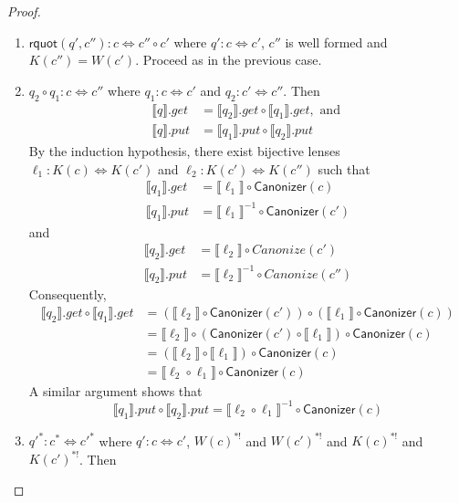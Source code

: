 \documentclass{svproc}
\newcommand{\kw}[1]{\ensuremath{\mathsf{#1}}}
\newcommand{\canonizer}{\ensuremath{\kw{Canonizer}}}
\begin{document}
\begin{proof}
\begin{enumerate}
  \item
  $\kw{rquot}(q', c''):c \Leftrightarrow c'' \circ c'$ where $q' : c \Leftrightarrow
  c'$, $c''$ is well formed and $K(c'') = W(c')$. Proceed as in the previous
  case.
\item
$q_2 \circ q_1: c \Leftrightarrow c''$ where $q_1 : c \Leftrightarrow c'$ and
$q_2 : c' \Leftrightarrow c''$. Then
  \begin{align*}
  \llbracket q \rrbracket.get &= \llbracket q_2 \rrbracket.get\circ \llbracket
  q_1 \rrbracket.get, \text{ and }\\
  \llbracket q \rrbracket.put &= \llbracket q_1 \rrbracket.put \circ \llbracket
  q_2 \rrbracket.put
  \end{align*}
  By the induction hypothesis, there exist bijective lenses
  $\ell_1 :
  K(c) \Leftrightarrow K(c')$ and $\ell_2 : K(c') \Leftrightarrow K(c'')$ such
  that
  \begin{align*}
\llbracket q_1 \rrbracket.get &= \llbracket \ell_1 \rrbracket \circ
\canonizer(c)\\
\llbracket q_1 \rrbracket.put &= {\llbracket \ell_1 \rrbracket}^{-1} \circ
\canonizer(c')
\end{align*}
and
\begin{align*}
\llbracket q_2 \rrbracket.get &= \llbracket \ell_2 \rrbracket \circ
Canonize(c')\\
\llbracket q_2 \rrbracket.put &= {\llbracket \ell_2 \rrbracket}^{-1} \circ
Canonize(c'')
\end{align*}
Consequently,
\begin{align*}
\llbracket q_2 \rrbracket.get \circ \llbracket q_1 \rrbracket.get &=
(\llbracket \ell_2 \rrbracket \circ \canonizer(c')) \circ (\llbracket \ell_1
\rrbracket \circ \canonizer(c))\\
&= \llbracket \ell_2 \rrbracket \circ (\canonizer(c') \circ \llbracket \ell_1
\rrbracket) \circ \canonizer(c)\\
&= (\llbracket \ell_2 \rrbracket \circ \llbracket \ell_1 \rrbracket) \circ
\canonizer(c)\\
&= \llbracket \ell_2  \circ  \ell_1 \rrbracket \circ
\canonizer(c)
\end{align*} 
A similar argument shows that 
$$\llbracket q_1 \rrbracket.put \circ \llbracket q_2 \rrbracket.put =
\llbracket \ell_2  \circ  \ell_1 \rrbracket^{-1} \circ
\canonizer(c)$$
\item  
${q'}^* : c^* \Leftrightarrow {c'}^*$ where $q' : c \Leftrightarrow c'$,
$W(c)^{*!}$ and $W(c')^{*!}$ and $K(c)^{*!}$ and $K(c')^{*!}$. Then

\end{enumerate}
\end{proof}
\end{document}
